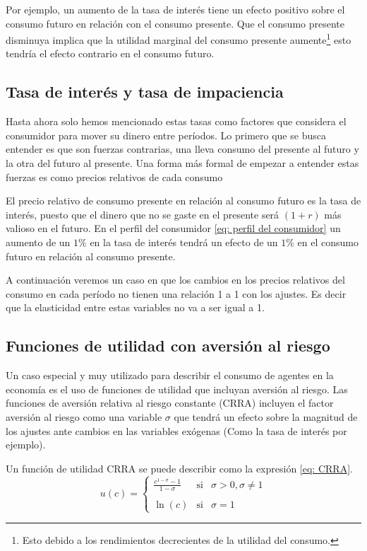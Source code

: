 Por ejemplo, un aumento de la tasa de interés tiene un efecto positivo sobre el consumo futuro en relación con el consumo presente. Que el consumo presente disminuya implica que la utilidad marginal del consumo presente aumente\footnote{Esto debido a los rendimientos decrecientes de la utilidad del consumo.} esto tendría el efecto contrario en el consumo futuro. 

\subsection{Tasa de interés y tasa de impaciencia}

Hasta ahora solo hemos mencionado estas tasas como factores que considera el consumidor para mover su dinero entre períodos. Lo primero que se busca entender es que son fuerzas contrarias, una lleva consumo del presente al futuro y la otra del futuro al presente. Una forma más formal de empezar a entender estas fuerzas es como precios relativos de cada consumo

El precio relativo de consumo presente en relación al consumo futuro es la tasa de interés, puesto que el dinero que no se gaste en el presente será $(1+r)$ más valioso en el futuro. En el perfil del consumidor \ref{eq: perfil del consumidor} un aumento de un $1\%$ en la tasa de interés tendrá un efecto de un $1\%$ en el consumo futuro en relación al consumo presente.

A continuación veremos un caso en que los cambios en los precios relativos del consumo en cada período no tienen una relación 1 a 1 con los ajustes. Es decir que la elasticidad entre estas variables no va a ser igual a 1.

\subsection{Funciones de utilidad con aversión al riesgo}

Un caso especial y muy utilizado para describir el consumo de agentes en la economía es el uso de funciones de utilidad que incluyan aversión al riesgo. Las funciones de aversión relativa al riesgo constante (CRRA) incluyen el factor aversión al riesgo como una variable $\sigma$ que tendrá un efecto sobre la magnitud de los ajustes ante cambios en las variables exógenas (Como la tasa de interés por ejemplo). 

Un función de utilidad CRRA se puede describir como la expresión \ref{eq: CRRA}.
\begin{equation}
    u(c)= \left\{ \begin{array}{lcc} \frac{c^{1-\sigma}-1}{1-\sigma} & \text{si} & \sigma >0,\sigma \neq 1 \\ \\ \ln{(c)} & \text{si} & \sigma = 1 \end{array} \right. \label{eq: CRRA}
\end{equation}

